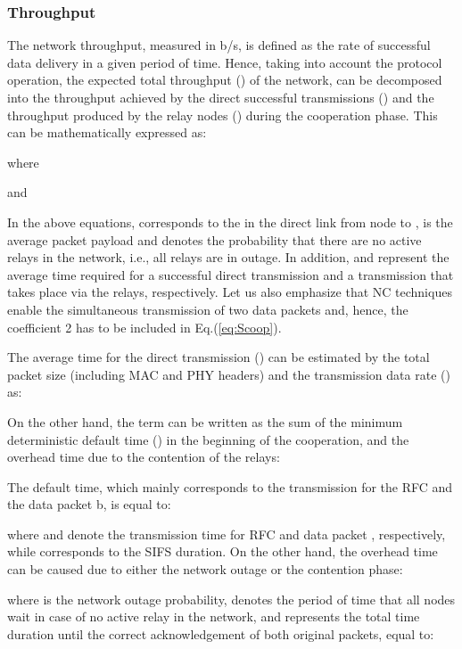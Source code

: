 \documentclass[12pt,draftcls, onecolumn]{IEEEtran}
\begin{document}
\subsubsection{Throughput}
\label{sec:throughput}

The network throughput, measured in b/s, is defined as the rate of successful data delivery in a given period of time. Hence, taking into account the protocol operation, the expected total throughput () of the network, can be decomposed into the throughput achieved by the direct successful transmissions () and the throughput produced by the relay nodes () during the cooperation phase. This can be mathematically expressed as:



where



and



In the above equations,  corresponds to the  in the direct link from node  to ,  is the average packet payload and  denotes the probability that there are no active relays in the network, i.e., all relays are in outage. In addition,  and  represent the average time required for a successful direct transmission and a transmission that takes place via the relays, respectively. Let us also emphasize that NC techniques enable the simultaneous transmission of two data packets and, hence, the coefficient 2 has to be included in Eq.(\ref{eq:Scoop}).

The average time for the direct transmission () can be estimated by the total packet size (including MAC and PHY headers) and the transmission data rate () as:


On the other hand, the term  can be written as the sum of the minimum deterministic default time () in the beginning of the cooperation, and the overhead time due to the contention of the relays:



The default time, which mainly corresponds to the transmission for the RFC and the data packet b, is equal to:


where  and  denote the transmission time for RFC and data packet , respectively, while  corresponds to the SIFS duration. On the other hand, the overhead time can be caused due to either the network outage or the contention phase:


where  is the network outage probability,  denotes the period of time that all nodes wait in case of no active relay in the network, and  represents the total time duration until the correct acknowledgement of both original packets, equal to:
\end{document}
